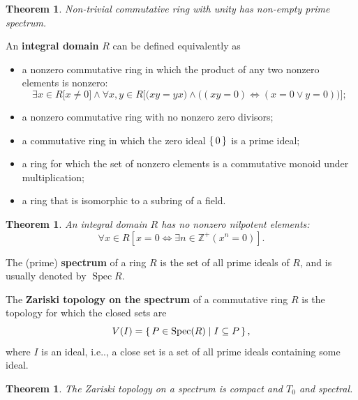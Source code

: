\documentclass[12pt, letterpaper]{article}
\makeatletter
\newcommand{\inte}{\mathbb{Z}}
\newcommand\ie{i.e\@ifnextchar.{}{.\@}}
\newtheorem{thm}[prop]{Theorem}
\theoremstyle{definition}
\theoremstyle{remark}
\theoremstyle{definition}
\theoremstyle{plain}
\numberwithin{equation}{section}
\makeatother
\begin{document}
	\begin{thm}
		Non-trivial commutative ring with unity
		has non-empty prime spectrum.
	\end{thm}

	\begin{def*}
		An \textbf{integral domain} $R$ can be defined equivalently as
		\begin{itemize}
			\item 
			a nonzero commutative ring
			in which the product of any two nonzero elements is nonzero:
			\[ \exists x\in R\Big[x\ne0\Big] \land \forall x,y\in R\Big[\big(xy=yx\big)\land \big((xy=0 )\iff (x=0\lor y=0)\big)  \Big]; \]
			\item 
			a nonzero commutative ring with no nonzero zero divisors;
			\item a commutative ring in which the zero ideal $\set{0}$ is a prime ideal;
			\item a ring for which the set of nonzero elements is a commutative monoid under multiplication;
			\item a ring that is isomorphic to a subring of a field.
		\end{itemize}
	\end{def*}
	
	\begin{thm}
		An integral domain $R$ has no nonzero nilpotent elements:
		\[\forall x\in R [x=0\iff \exists n \in \inte^+ (x^n=0)].\]
	\end{thm}


	\begin{def*}
		The (prime) \textbf{spectrum} of a ring $R$
		is the set of all prime ideals of $R$, and is usually denoted by $\operatorname {Spec} {R}$.
	\end{def*}
	\begin{def*}
		The \textbf{Zariski topology on the spectrum} of a commutative ring $R$ is the topology for which the closed sets are
		\[V(I)=\set{P\in\operatorname{Spec}(R)|I\subseteq P}, \]
		where $I$ is an ideal, \ie, a close set is a set of all prime ideals containing some ideal.
	\end{def*}
	\begin{thm}
		The Zariski topology on a spectrum is compact and $T_0$ and spectral.
	\end{thm}
	
\end{document}
